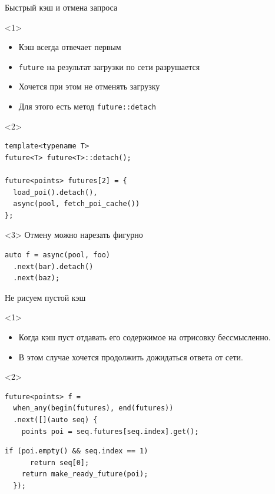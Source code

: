 \documentclass[aspectratio=169,hyperref={unicode},17pt]{beamer}
\begin{document}
\begin{frame}[fragile,t]{Быстрый кэш и отмена запроса}
\begin{onlyenv}<1>
\begin{itemize}
 \item Кэш всегда отвечает первым
 \item \texttt{future} на результат загрузки по сети разрушается
 \item Хочется при этом не отменять загрузку
 \item Для этого есть метод \texttt{future::detach}
\end{itemize}
\end{onlyenv}
\begin{onlyenv}<2>
\begin{lstlisting}[style=cppcode]
template<typename T>
future<T> future<T>::detach();

future<points> futures[2] = {
  load_poi().detach(),
  async(pool, fetch_poi_cache())
};
\end{lstlisting}
\end{onlyenv}
\begin{onlyenv}<3>
Отмену можно нарезать фигурно
\begin{lstlisting}[style=cppcode]
auto f = async(pool, foo)
  .next(bar).detach()
  .next(baz);
\end{lstlisting}
\end{onlyenv}
\end{frame}

\begin{frame}[fragile,t]{Не рисуем пустой кэш}
\begin{onlyenv}<1>
\begin{itemize}
 \item Когда кэш пуст отдавать его содержимое на отрисовку бессмысленно.
 \item В этом случае хочется продолжить дожидаться ответа от сети.
\end{itemize}
\end{onlyenv}
\begin{onlyenv}<2>
\begin{lstlisting}[style=cppcode,belowskip=0pt]
future<points> f =
  when_any(begin(futures), end(futures))
  .next([](auto seq) {
    points poi = seq.futures[seq.index].get();
\end{lstlisting}
\begin{lstlisting}[style=cppcode,backgroundcolor=\color{gray!30},aboveskip=0pt,belowskip=0pt]
    if (poi.empty() && seq.index == 1)
      return seq[0];
    return make_ready_future(poi);
  });
\end{lstlisting}
\end{onlyenv}
\end{frame}
\end{document}
